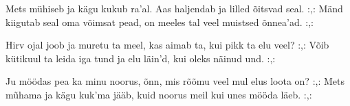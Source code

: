 Mets m\"uhiseb ja k\"agu kukub ra'al.
Aas haljendab ja lilled \~oitsvad seal.
:,: M\"and kiigutab seal oma v\~oimsat pead,
    on meeles tal veel muistsed \~onnea'ad. :,: 

Hirv ojal joob ja muretu ta meel,
kas aimab ta, kui pikk ta elu veel?
:,: V\~oib k\"utikuul ta leida iga tund
    ja elu l\"ain'd, kui oleks n\"ainud und. :,: 

Ju m\"o\"odas pea ka minu noorus, \~onn,
mis r\~o\~omu veel mul elus loota on?
:,: Mets m\~uhama ja k\"agu kuk'ma j\"a\"ab,
    kuid noorus meil kui unes m\"o\"oda l\"aeb. :,: 